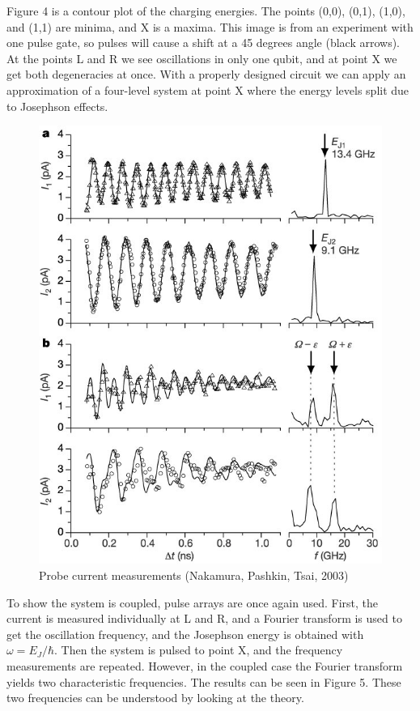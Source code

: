 \documentclass[12pt,letterpaper,notitlepage]{report}
\begin{document}
Figure 4 is a contour plot of the charging energies. The points (0,0), (0,1), (1,0), and (1,1) are minima, and X is a maxima. This image is from an experiment with one pulse gate, so pulses will cause a shift at a 45 degrees angle (black arrows). At the points L and R we see oscillations in only one qubit, and at point X we get both degeneracies at once. With a properly designed circuit we can apply an approximation of a four-level system at point X where the energy levels split due to Josephson effects.

\begin{figure}[ht]
    \centering
    \includegraphics[height=0.6\textheight]{img/probe-current-osc.jpg}
    \caption{Probe current measurements (Nakamura, Pashkin, Tsai, 2003) \cite{onePulseGateNature}}
\end{figure}

To show the system is coupled, pulse arrays are once again used. First, the current is measured individually at L and R, and a Fourier transform is used to get the oscillation frequency, and the Josephson energy is obtained with $\omega=E_J/\hbar$. Then the system is pulsed to point X, and the frequency measurements are repeated. However, in the coupled case the Fourier transform yields two characteristic frequencies. The results can be seen in Figure 5. These two frequencies can be understood by looking at the theory.
\end{document}
